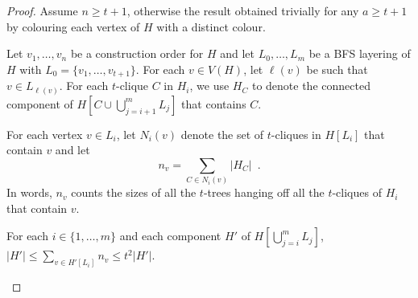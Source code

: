 \documentclass[kpfonts]{patmorin}
\theoremstyle{named}
\begin{document}
\begin{proof}
    Assume $n\ge t+1$, otherwise the result obtained trivially for any $a\ge t+1$ by colouring each vertex of $H$ with a distinct colour.




    Let $v_1,\ldots,v_n$ be a construction order for $H$ and let $L_0,\ldots,L_m$ be a BFS layering of $H$ with $L_0=\{v_1,\ldots,v_{t+1}\}$.
    For each $v\in V(H)$, let $\ell(v)$ be such that $v\in L_{\ell(v)}$.
    For each $t$-clique $C$ in $H_i$, we use $H_C$ to denote the connected component of $H[C\cup\bigcup_{j=i+1}^m L_j]$ that contains $C$.

    For each vertex $v\in L_i$, let $N_i(v)$ denote the set of $t$-cliques in $H[L_i]$ that contain $v$ and let
    \begin{equation}
        n_v=\sum_{C\in N_i(v)}|H_{C}| \enspace . \label{nv}
    \end{equation}
    In words, $n_v$ counts the sizes of all the $t$-trees hanging off all the $t$-cliques of $H_i$ that contain $v$.

    \begin{clm}\label{size-claim}
        For each $i\in\{1,\ldots,m\}$ and each component $H'$ of $H[\bigcup_{j=i}^m L_j]$, $|H'|\le \sum_{v\in H'[L_i]} n_v \le t^2|H'|$.
    \end{clm}


\end{proof}
\end{document}

